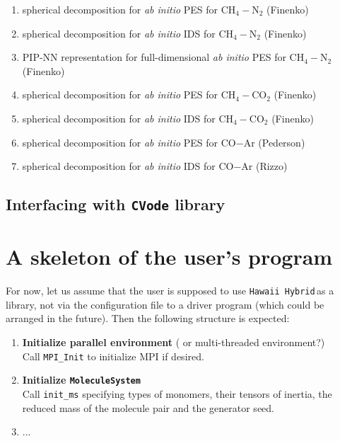 \documentclass{article}
\newcommand{\libname}{\texttt{Hawaii Hybrid}\,}
\begin{document}
\begin{enumerate}
\item spherical decomposition for \textit{ab initio} PES for CH$_4-$N$_2$ (Finenko)
\item spherical decomposition for \textit{ab initio} IDS for CH$_4-$N$_2$ (Finenko)
\item PIP-NN representation for full-dimensional \textit{ab initio} PES for CH$_4-$N$_2$ (Finenko)
\item spherical decomposition for \textit{ab initio} PES for CH$_4-$CO$_2$ (Finenko)
\item spherical decomposition for \textit{ab initio} IDS for CH$_4-$CO$_2$ (Finenko)
\item spherical decomposition for \textit{ab initio} PES for CO$-$Ar (Pederson)
\item spherical decomposition for \textit{ab initio} IDS for CO$-$Ar (Rizzo)
\end{enumerate}

\subsection{Interfacing with \texttt{CVode} library}
\label{subsec:cvode}

\section{A skeleton of the user's program}
\label{sec:user-program}

For now, let us assume that the user is supposed to use \libname as a library, not via the configuration file to a driver program (which could be arranged in the future). Then the following structure is expected:

\begin{enumerate}

\item \textbf{Initialize parallel environment} ({\color{red} or multi-threaded environment?}) \\
Call \texttt{MPI\_Init} to initialize MPI if desired.

\item \textbf{Initialize \texttt{MoleculeSystem}} \\
Call \texttt{init\_ms} specifying types of monomers, their tensors of inertia, the reduced mass of the molecule pair and the generator seed.

\item ...

\end{enumerate}
\end{document}
